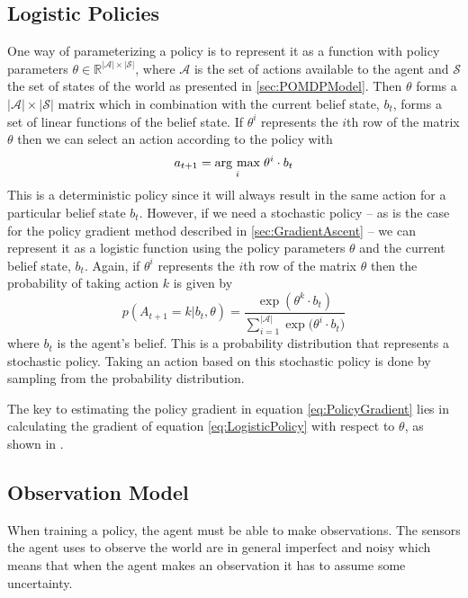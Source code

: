 \subsection{Logistic Policies}
\label{sec:LogisticPolicies}
One way of parameterizing a policy is to represent it as a function with policy parameters $\theta \in \mathds{R^{|\mathcal{A}| \times |\mathcal{S}|}}$, where $\mathcal{A}$ is the set of actions available to the agent and $\mathcal{S}$ the set of states of the world as presented in \ref{sec:POMDPModel}. Then $\theta$ forms a $|\mathcal{A}| \times |\mathcal{S}|$ matrix which in combination with the current belief state, $b_t$, forms a set of linear functions of the belief state. If $\theta^i$ represents the $i$th row of the matrix $\theta$ then we can select an action according to the policy with
\begin{equation}
  a_{t+1} = \underset{i}{\operatorname{arg}\,\operatorname{max}}\; \theta^i \cdot b_t
\end{equation}
This is a deterministic policy since it will always result in the same action for a particular belief state $b_t$. However, if we need a stochastic policy -- as is the case for the policy gradient method described in \ref{sec:GradientAscent} -- we can represent it as a logistic function using the policy parameters $\theta$ and the current belief state, $b_t$. Again, if $\theta^i$ represents the $i$th row of the matrix $\theta$ then the probability of taking action $k$ is given by
\begin{equation}
\label{eq:LogisticPolicy}
  p(A_{t+1} = k | b_t, \theta) = \frac{ \exp{(\theta^k \cdot b_t)} }{ \sum_{i=1}^{|\mathcal{A}|}{ \exp{( \theta^i \cdot b_t}) }} 
\end{equation} 
where $b_t$ is the agent's belief. This is a probability distribution that represents a stochastic policy. Taking an action based on this stochastic policy is done by sampling from the probability distribution.

The key to estimating the policy gradient in equation \eqref{eq:PolicyGradient} lies in calculating the gradient of equation \eqref{eq:LogisticPolicy} with respect to $\theta$, as shown in \cite{Butko2010b}.

\subsection{Observation Model}
\label{sec:ObservationModel}
When training a policy, the agent must be able to make observations. The sensors the agent uses to observe the world are in general imperfect and noisy which means that when the agent makes an observation it has to assume some uncertainty.

